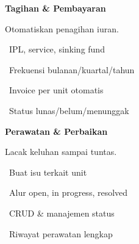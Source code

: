 \documentclass[a4paper]{article}
\begin{document}
\vspace{8pt}

\noindent
\begin{minipage}[t]{0.485\textwidth}
    \colorbox{PurplePrimary}{%
        \begin{minipage}{\dimexpr\textwidth-2\fboxsep\relax}
            {\fontsize{10}{13}\selectfont\bfseries\color{White} Tagihan \& Pembayaran}
        \end{minipage}}\par
    \vspace{4pt}
    {\fontsize{9}{12}\selectfont\color{TextDark}%
    Otomatiskan penagihan iuran.\par\vspace{3pt}
    \textbullet\ IPL, service, sinking fund\par\vspace{2pt}%
    \textbullet\ Frekuensi bulanan/kuartal/tahun\par\vspace{2pt}%
    \textbullet\ Invoice per unit otomatis\par\vspace{2pt}%
    \textbullet\ Status lunas/belum/menunggak}%

\end{minipage}%
\hfill
\begin{minipage}[t]{0.485\textwidth}
    \colorbox{BlueDark}{%
        \begin{minipage}{\dimexpr\textwidth-2\fboxsep\relax}
            {\fontsize{10}{13}\selectfont\bfseries\color{White} Perawatan \& Perbaikan}
        \end{minipage}}\par
    \vspace{4pt}
    {\fontsize{9}{12}\selectfont\color{TextDark}%
    Lacak keluhan sampai tuntas.\par\vspace{3pt}
    \textbullet\ Buat isu terkait unit\par\vspace{2pt}%
    \textbullet\ Alur open, in progress, resolved\par\vspace{2pt}%
    \textbullet\ CRUD \& manajemen status\par\vspace{2pt}%
    \textbullet\ Riwayat perawatan lengkap}%

\end{minipage}

\vspace{8pt}
\end{document}

